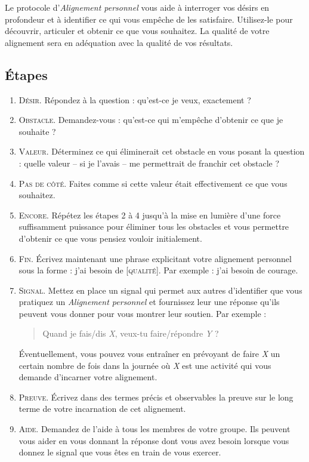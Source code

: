 \documentclass[paper=6in:9in,pagesize=pdftex,headinclude=on,footinclude=on,11pt]{scrbook}
\begin{document}
Le protocole d'\emph{Alignement personnel} vous aide à interroger vos désirs en profondeur et à identifier ce qui vous empêche de les satisfaire. Utilisez-le
pour découvrir, articuler et obtenir ce que vous souhaitez. La qualité de votre alignement sera en adéquation avec la qualité de vos résultats.

\subsection{Étapes}
\begin{enumerate}
	\item \textsc{Désir.} Répondez à la question : \og{}qu'est-ce je veux, exactement ?\fg{}
	\item \textsc{Obstacle.} Demandez-vous : \og{}qu'est-ce qui m'empêche d'obtenir ce que je souhaite ?\fg{}
	\item \textsc{Valeur.} Déterminez ce qui éliminerait cet obstacle en vous posant la question : \og{}quelle valeur -- si je
	      l'avais -- me permettrait de franchir cet obstacle ?\fg{}
	\item \textsc{Pas de côté.} Faites comme si cette valeur était effectivement ce que vous souhaitez.
	\item \textsc{Encore.} Répétez les étapes 2 à 4 jusqu'à la mise en lumière d'une force suffisamment puissance pour éliminer tous les obstacles et vous permettre
	      d'obtenir ce que vous pensiez vouloir initialement.
	\item \textsc{Fin.} Écrivez maintenant une phrase explicitant votre alignement personnel sous la forme : \og{}j'ai besoin de [\textsc{qualité}]\fg{}.
	      Par exemple : \og{}j'ai besoin de courage\fg{}.
	\item \textsc{Signal.} Mettez en place un signal qui permet aux autres d'identifier que vous pratiquez un \emph{Alignement personnel}
	      et fournissez leur une réponse qu'ils peuvent vous donner pour vous montrer leur soutien. Par exemple :
	      \begin{quote}
	      	\og{}Quand je fais/dis \emph{X}, veux-tu faire/répondre \emph{Y} ?\fg{}
	      \end{quote}
	      Éventuellement, vous pouvez vous entraîner en prévoyant de faire \emph{X} un certain nombre de fois dans la journée où \emph{X} est une activité
	      qui vous demande d'incarner votre alignement.
	\item \textsc{Preuve.} Écrivez dans des termes précis et observables la preuve sur le long terme de votre incarnation de cet alignement.
	\item \textsc{Aide.} Demandez de l'aide à tous les membres de votre groupe. Ils peuvent vous aider en vous donnant la réponse dont vous avez besoin lorsque
	      vous donnez le signal que vous êtes en train de vous exercer.
\end{enumerate}
\end{document}
